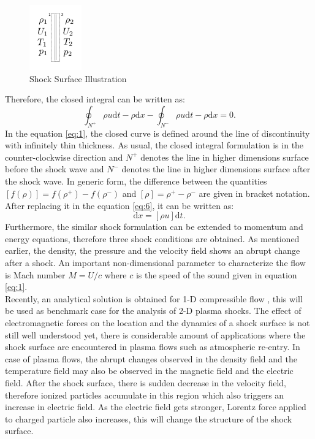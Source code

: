 \documentclass[12pt]{report}
\begin{document}
\begin{figure}
\label{fig:shock}
\centering
\includegraphics[width=0.2\textwidth]{shock.png}
\caption{Shock Surface Illustration}
\end{figure}
Therefore, the closed integral can be written as:
\begin{equation}
\label{eq:6}
\oint_{N^+} \rho u \mathrm{d} t-\rho \mathrm{d} x-\oint_{N^-} \rho u \mathrm{d} t-\rho \mathrm{d} x =0.
\end{equation}
In the equation \ref{eq:1}, the closed curve is defined around the line of discontinuity with infinitely thin thickness. As usual, the closed integral formulation is in the counter-clockwise direction and $N^+$ denotes the line in higher dimensions surface before the shock wave and $N^-$ denotes the line in higher dimensions surface after the shock wave.
In generic form, the difference between the quantities $[f(\rho)]=f(\rho ^+)-f(\rho ^-)$ and $[\rho]=\rho ^+-\rho ^-$ are given in bracket notation. After replacing it in the equation \ref{eq:6}, it can be written as:
\begin{equation}
	[\rho]\mathrm{d} x=[ \rho u ]\mathrm{d} t.
\end{equation}
Furthermore, the similar shock formulation can be extended to momentum and energy equations, therefore three shock conditions are obtained. As mentioned earlier, the density, the pressure and
\newpage
the velocity field shows an abrupt change after a shock. An important non-dimensional parameter to characterize the flow is Mach number $M=U/c$ where $c$ is the speed of the sound given in equation \ref{eq:1}. 
\\
Recently, an analytical solution is obtained for 1-D compressible flow \cite{Johnson}, this will be used as benchmark case for the analysis of 2-D plasma shocks. The effect of electromagnetic forces on the location and the dynamics of a shock surface is not still well understood yet, there is considerable amount of applications where the shock surface are encountered in plasma flows such as atmospheric re-entry. In case of plasma flows, the abrupt changes observed in the density field and the temperature field may also be observed in the magnetic field and the electric field. After the shock surface, there is sudden decrease in the velocity field, therefore ionized particles accumulate in this region which also triggers an increase in electric field. As the electric field gets stronger, Lorentz force applied to charged particle also increases, this will change the structure of the shock surface.
\end{document}
